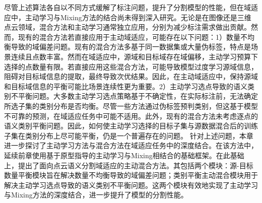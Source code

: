     尽管上述算法各自以不同方式缓解了标注问题，提升了分割模型的性能，但在域适应中，主动学习与Mixing方法的结合尚未得到深入研究。无论是在图像还是三维点云领域，混合方法和主动学习通常独立应用，分别为减少标注需求做出贡献。然而，现有的混合方法若直接应用于主动域适应，可能存在以下问题：1）数量不均衡导致的域偏差问题。现有的混合方法多基于同一数据集或大量伪标签，特点是场景连续且点数丰富。然而在域适应中，源域和目标域存在域偏移，主动学习预算下选择的点数量有限。若直接应用这些混合方法，可能导致模型过度学习源域信息，阻碍对目标域信息的提取，最终导致次优结果。因此，在主动域适应中，保持源域和目标域信息的平衡可能比场景连续性更为重要。2）主动学习选点导致的语义类别不平衡问题。大多数主动学习选点策略基于不确定性，在实际标注前，无法确定所选子集的类别分布是否均衡。尽管一些方法通过伪标签预判类别，但这基于模型不可靠的预测，在域适应任务中可能不适用。此外，现有的混合方法未考虑逐点的语义类别平衡问题。因此，如何使主动学习选择的目标子集与源数据混合后的训练子集在类别分布上尽可能平衡，仍是一个普遍存在的问题。
    针对上述问题，本章进一步探讨了主动学习方法与混合方法在域适应任务中的深度结合。在该方法中，延续前章使用基于原型指导的主动学习与Mixing相结合的基础框架。在此基础上，提出了面向点云语义分割域适应的主动混合方法。其包括两个模块：源-目标数量平衡模块旨在解决数量不均衡导致的域偏差问题；类别平衡主动混合模块用于解决主动学习选点导致的语义类别不平衡问题。这两个模块有效地实现了主动学习与Mixing方法的深度结合，进一步提升了模型的分割性能。
    
